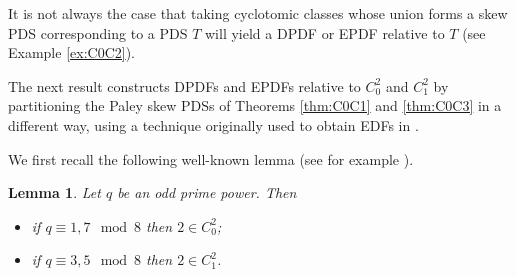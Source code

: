 \documentclass[12pt, a4paper]{article}
\newtheorem{lemma}[theorem]{Lemma}
\theoremstyle{definition}
\begin{document}
It is not always the case that taking cyclotomic classes whose union forms a skew PDS corresponding to a PDS $T$ will yield a DPDF or EPDF relative to $T$ (see Example \ref{ex:C0C2}).

The next result constructs DPDFs and EPDFs relative to $C_0^2$ and $C_1^2$ by partitioning the Paley skew PDSs of Theorems \ref{thm:C0C1} and \ref{thm:C0C3} in a different way, using a technique originally used to obtain EDFs in \cite{ChaDin}. 

We first recall the following well-known lemma (see for example \cite{Sto}).
\begin{lemma}\label{lem:2is}
Let $q$ be an odd prime power.  Then 
\begin{itemize}
\item[(i)] if $q \equiv 1,7 \mod 8$ then $2 \in C_0^2$;
\item[(ii)] if $q \equiv 3,5 \mod 8$ then $2 \in C_1^2$.
\end{itemize}
\end{lemma}
\end{document}

